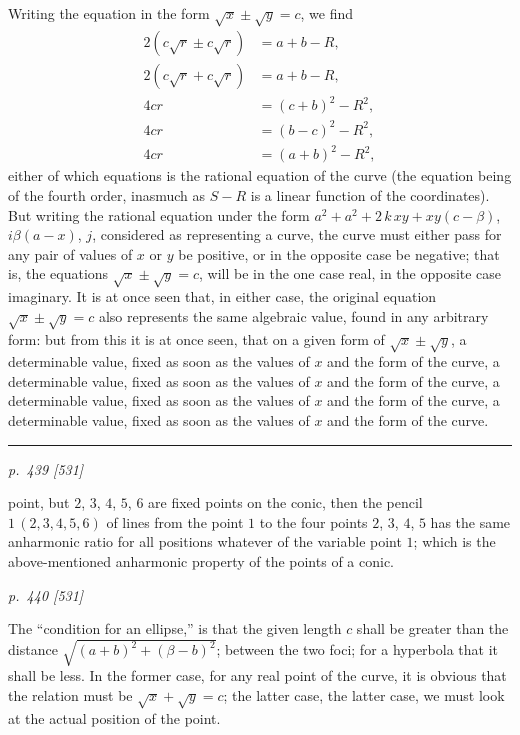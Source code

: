 \documentclass[11pt,a4paper]{book}
\begin{document}
Writing the equation in the form $\sqrt{x} \pm \sqrt{y} = c$, we find
\begin{align*}
2(c\sqrt{r} \pm c\sqrt{r}) &= a + b - R,\\
2(c\sqrt{r} + c\sqrt{r}) &= a + b - R,\\
4cr &= (c + b)^2 - R^2,\\
4cr &= (b - c)^2 - R^2,\\
4cr &= (a + b)^2 - R^2,
\end{align*}
either of which equations is the rational equation of the curve (the equation being of the fourth order, inasmuch as $S - R$ is a linear function of the coordinates). But writing the rational equation under the form $a^2 + a^2 + 2\,k\,xy + xy(c - \beta)$, $i\beta(a - x)$, $j$, considered as representing a curve, the curve must either pass for any pair of values of $x$ or $y$ be positive, or in the opposite case be negative; that is, the equations $\sqrt{x} \pm \sqrt{y} = c$, will be in the one case real, in the opposite case imaginary. It is at once seen that, in either case, the original equation $\sqrt{x} \pm \sqrt{y} = c$ also represents the same algebraic value, found in any arbitrary form: but from this it is at once seen, that on a given form of $\sqrt{x} \pm \sqrt{y}$, a determinable value, fixed as soon as the values of $x$ and the form of the curve, a determinable value, fixed as soon as the values of $x$ and the form of the curve, a determinable value, fixed as soon as the values of $x$ and the form of the curve, a determinable value, fixed as soon as the values of $x$ and the form of the curve.

\smallskip
\hrule
\smallskip
{}

\clearpage

\bigskip
\textit{p.~439 [531]}
\smallskip

\noindent
point, but $2$, $3$, $4$, $5$, $6$ are fixed points on the conic, then the pencil $1\,(2, 3, 4, 5, 6)$ of lines from the point $1$ to the four points $2$, $3$, $4$, $5$ has the same anharmonic ratio for all
positions whatever of the variable point $1$; which is the above-mentioned anharmonic
property of the points of a conic.


\clearpage

\bigskip
\textit{p.~440 [531]}
\smallskip

The ``condition for an ellipse,'' is that the given length $c$ shall be greater than the
distance $\sqrt{(a + b)^2 + (\beta - b)^2}$; between the two foci; for a hyperbola that it shall be
less. In the former case, for any real point of the curve, it is obvious that the
relation must be $\sqrt{x} + \sqrt{y} = c$; the latter case, the latter case, we must look at the actual position of the point.
\end{document}
